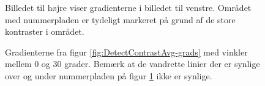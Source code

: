 \begin{figure}[htbp]
  \centering
  \begin{minipage}[b]{5 cm}
  \end{minipage}
  \begin{minipage}[b]{5 cm}
  \end{minipage}
  \caption{Billedet til højre viser gradienterne i billedet til venstre. Området med nummerpladen er tydeligt markeret på grund af de store kontraster i området.}
  \label{fig:DetectContrastAvg-grads}
  \end{figure}

\begin{figure}[htp]
  \centering
  \caption{Gradienterne fra figur \vref{fig:DetectContrastAvg-grads} med vinkler mellem 0 og 30 grader. Bemærk at de vandrette linier der er synlige over og under nummerpladen på figur \ref{fig:DetectContrastAvg-grads} ikke er synlige.}
  \label{fig:DetectContrastAvg-hgrads}  
\end{figure}


